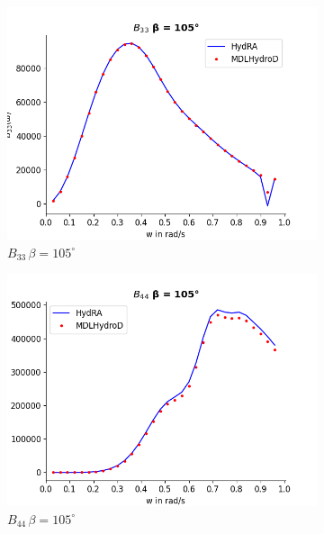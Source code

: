 \begin{figure}[H]
    \vspace{5pt}%
    \begin{subfigure}[b]{0.49\textwidth}
        \includegraphics[width=\textwidth]{plots/kcs/rad_damp/b33.png}
        \caption{$B_{33}\, \beta = 105^{\circ}$}
    \end{subfigure}
    \begin{subfigure}[b]{0.49\textwidth}
        \includegraphics[width=\textwidth]{plots/kcs/rad_damp/b44.png}
        \caption{$B_{44} \, \beta = 105^{\circ}$}
    \end{subfigure}
    \vspace{5pt}%
    \begin{subfigure}[b]{0.49\textwidth}

\end{subfigure}
\end{figure}
